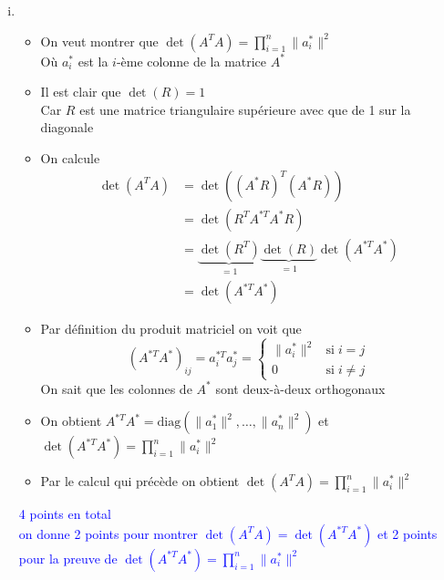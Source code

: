 \documentclass[11pt, a4paper, oneside]{article}
\newcommand{\indice}[1]{{\scriptsize \color{RubineRed} {#1}}}
\begin{document}
\begin{enumerate}[i)]
\item 
\begin{itemize}
\item On veut montrer que $\det(A^TA) = \prod_{i=1}^n \lVert a_i^* \rVert^2$ \\
\indice{Où $a_i^*$ est la $i$-ème colonne de la matrice $A^*$}
\item Il est clair que $\det(R)=1$ \\
\indice{Car $R$ est une matrice triangulaire supérieure avec que de 1 sur la diagonale}
\item On calcule
\begin{align*}
    \det(A^TA) &= \det((A^*R)^T(A^*R)) \\
    &= \det(R^TA^{*T}A^*R) \\
    &= \underbrace{\det(R^T)}_{=1}\underbrace{\det(R)}_{=1}\det(A^{*T}A^*) \\
    &= \det(A^{*T}A^*)
\end{align*}
\item Par définition du produit matriciel on voit que
$$(A^{*T}A^*)_{ij} = a_i^{*T}a_j^* = \begin{cases} \lVert a_i^* \rVert^2 & \text{si} \; i=j \\ 0 & \text{si} \; i\neq j \end{cases}$$
\indice{On sait que les colonnes de $A^*$ sont deux-à-deux orthogonaux}
\item On obtient $A^{*T}A^* = \text{diag}(\lVert a_1^* \rVert^2, \ldots, \lVert a_n^* \rVert^2)$ et $\det(A^{*T}A^*) = \prod_{i=1}^n \lVert a_i^* \rVert^2$
\item Par le calcul qui précède on obtient
$\det(A^TA) = \prod_{i=1}^n \lVert a_i^* \rVert^2$ \\
\end{itemize}
\textcolor{blue}{4 points en total \\ on donne 2 points pour montrer $\det(A^TA) = \det(A^{*T}A^*)$ et 2 points pour la preuve de $\det(A^{*T}A^*) = \prod_{i=1}^n \lVert a_i^* \rVert^2$}


\end{enumerate}
\end{document}
